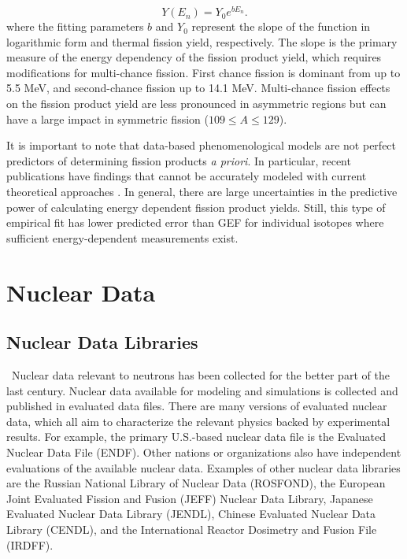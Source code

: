 \begin{equation} \label{eq:nagy}
Y(E_{n}) = Y_{0}e^{bE_{n}}.
\end{equation}
where the fitting parameters $b$ and $Y_{0}$ represent the slope of the function in logarithmic form and thermal fission yield, respectively\cite{Nagy1978}. 
The slope is the primary measure of the energy dependency of the fission product yield, which requires  modifications for multi-chance fission.
First chance fission is dominant from up to 5.5 MeV, and second-chance fission up to 14.1 MeV\cite{Nagy1978}. 
Multi-chance fission effects on the fission product yield are less pronounced in asymmetric regions but can have a large impact in symmetric fission ($109 \leq A \leq 129$)\cite{Bevins}\cite{Nagy1978}. 

It is important to note that data-based phenomenological models are not perfect predictors of determining fission products \textit{a priori}. 
In particular, recent publications have findings that cannot be accurately modeled with current theoretical approaches \cite{Tonchev0}. 
In general, there are large uncertainties in the predictive power of calculating energy dependent fission product yields. 
Still, this type of empirical fit has lower predicted error than GEF for individual isotopes where sufficient energy-dependent measurements exist. 

\section{Nuclear Data}
\subsection{Nuclear Data Libraries}

\ Nuclear data relevant to neutrons has been collected for the better part of the last century. 
Nuclear data available for modeling and simulations is collected and published in evaluated data files. 
There are many versions of evaluated nuclear data, which all aim to characterize the relevant physics backed by experimental results. 
For example, the primary U.S.-based nuclear data file is the Evaluated Nuclear Data File (ENDF). 
Other nations or organizations also have independent evaluations of the available nuclear data. 
Examples of other nuclear data libraries are the Russian National Library of Nuclear Data (ROSFOND), the European Joint Evaluated Fission and Fusion (JEFF) Nuclear Data Library, Japanese Evaluated Nuclear Data Library (JENDL), Chinese Evaluated Nuclear Data Library (CENDL), and the International Reactor Dosimetry and Fusion File (IRDFF).

